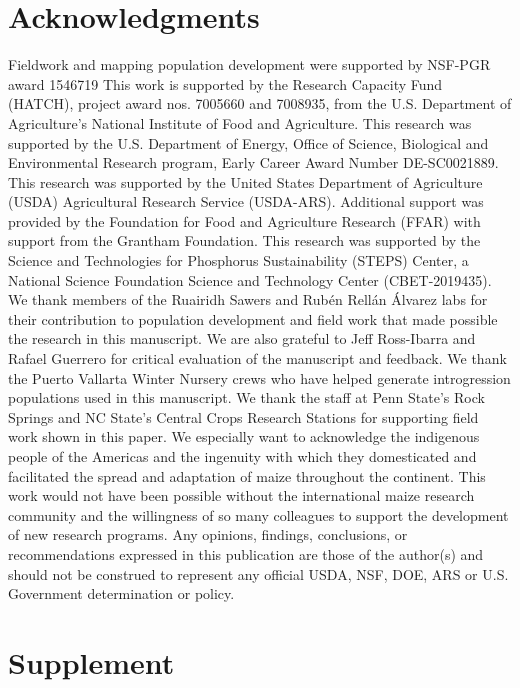 \documentclass[9pt,twocolumn,twoside]{rilabRxiv}
\begin{document}
\section{Acknowledgments}
Fieldwork and mapping population development were supported by NSF-PGR award 1546719
This work is supported by the Research Capacity Fund (HATCH), project award nos. 7005660 and 7008935, from the U.S. Department of Agriculture’s National Institute of Food and Agriculture.  
This research was supported by the U.S. Department of Energy, Office of Science, Biological and Environmental Research program, Early Career Award Number DE-SC0021889. 
This research was supported by the United States Department of Agriculture (USDA) Agricultural Research Service (USDA-ARS). Additional support was provided by the Foundation for Food and Agriculture Research (FFAR) with support from the Grantham Foundation.
This research was supported by the Science and Technologies for Phosphorus Sustainability (STEPS) Center, a National Science Foundation Science and Technology Center (CBET-2019435).
We thank members of the Ruairidh Sawers and Rubén Rellán Álvarez labs for their contribution to population development and field work that made possible the research in this manuscript.
We are also grateful to Jeff Ross-Ibarra and Rafael Guerrero for critical evaluation of the manuscript and feedback.
We thank the  Puerto Vallarta Winter Nursery crews who have helped generate introgression populations used in this manuscript.
We thank the staff at Penn State's Rock Springs and NC State's Central Crops Research Stations for supporting field work shown in this paper.
We especially want to acknowledge the indigenous people of the Americas and the ingenuity with which they domesticated and facilitated the spread and adaptation of maize throughout the continent.
This work would not have been possible without the international maize research community and the willingness of so many colleagues to support the development of new research programs.
Any opinions, findings, conclusions, or recommendations expressed in this publication are those of the author(s) and should not be construed to represent any official USDA, NSF, DOE, ARS or U.S. Government determination or policy.



\pagebreak
\onecolumn

\section*{Supplement}
\end{document}
